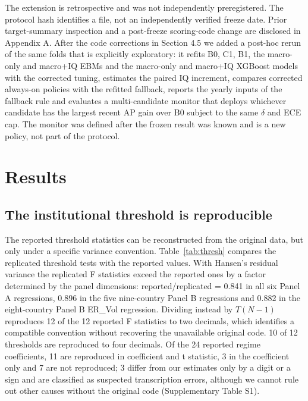 \documentclass[preprint,12pt,authoryear]{elsarticle}
\begin{document}
The extension is retrospective and was not independently preregistered. The protocol hash identifies a file, not an independently verified freeze date. Prior target-summary inspection and a post-freeze scoring-code change are disclosed in Appendix A. After the code corrections in Section 4.5 we added a post-hoc rerun of the same folds that is explicitly exploratory: it refits B0, C1, B1, the macro-only and macro+IQ EBMs and the macro-only and macro+IQ XGBoost models with the corrected tuning, estimates the paired IQ increment, compares corrected always-on policies with the refitted fallback, reports the yearly inputs of the fallback rule and evaluates a multi-candidate monitor that deploys whichever candidate has the largest recent AP gain over B0 subject to the same $\delta$ and ECE cap. The monitor was defined after the frozen result was known and is a new policy, not part of the protocol.

\section{Results}
\subsection{The institutional threshold is reproducible}
The reported threshold statistics can be reconstructed from the original data, but only under a specific variance convention. Table~\ref{tab:thresh} compares the replicated threshold tests with the reported values. With Hansen's residual variance the replicated F statistics exceed the reported ones by a factor determined by the panel dimensions: reported/replicated = 0.841 in all six Panel A regressions, 0.896 in the five nine-country Panel B regressions and 0.882 in the eight-country Panel B ER\_Vol regression. Dividing instead by $T(N-1)$ reproduces 12 of the 12 reported F statistics to two decimals, which identifies a compatible convention without recovering the unavailable original code. 10 of 12 thresholds are reproduced to four decimals. Of the 24 reported regime coefficients, 11 are reproduced in coefficient and t statistic, 3 in the coefficient only and 7 are not reproduced; 3 differ from our estimates only by a digit or a sign and are classified as suspected transcription errors, although we cannot rule out other causes without the original code (Supplementary Table S1).
\end{document}
